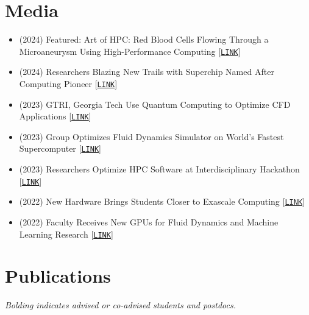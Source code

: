 \section{Media}

\begin{itemize}
    \item (2024) Featured: Art of HPC: Red Blood Cells Flowing Through a Microaneurysm Using High-Performance Computing [\href{https://sites.gatech.edu/research/sc-2024://sites.gatech.edu/research/sc-2024/}{\tt LINK}]

    \item (2024) Researchers Blazing New Trails with Superchip Named After Computing Pioneer [\href{https://www.cc.gatech.edu/news/researchers-blazing-new-trails-superchip-named-after-computing-pioneer}{\tt LINK}] 

    \item (2023) GTRI, Georgia Tech Use Quantum Computing to Optimize CFD Applications
 [\href{https://gtri.gatech.edu/newsroom/gtri-georgia-tech-use-quantum-computing-optimize-cfd-applications}{\tt LINK}]

    \item (2023) Group Optimizes Fluid Dynamics Simulator on World's Fastest Supercomputer [\href{https://www.cc.gatech.edu/news/group-optimizes-fluid-dynamics-simulator-worlds-fastest-supercomputer}{\tt LINK}]

    \item (2023) Researchers Optimize HPC Software at Interdisciplinary Hackathon
[\href{https://www.cc.gatech.edu/news/researchers-optimize-hpc-software-interdisciplinary-hackathon}{\tt LINK}]

    \item (2022) New Hardware Brings Students Closer to Exascale Computing [\href{https://www.cc.gatech.edu/news/new-hardware-brings-students-closer-exascale-computing}{\tt LINK}]

    \item (2022) Faculty Receives New GPUs for Fluid Dynamics and Machine Learning Research [\href{https://www.cc.gatech.edu/news/faculty-receives-new-gpus-fluid-dynamics-and-machine-learning-research}{\tt LINK}]
\end{itemize}

\section{Publications}

\begin{center}
    \textit{Bolding indicates advised or co-advised students and postdocs.}
\end{center}

